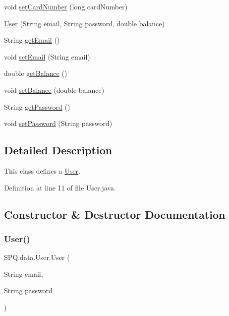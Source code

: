 \begin{DoxyCompactItemize}
\item 
void \mbox{\hyperlink{class_s_p_q_1_1data_1_1_user_a6d98a72cb61e95f5417e10e0ba80afab}{set\+Card\+Number}} (long card\+Number)
\item 
\mbox{\hyperlink{class_s_p_q_1_1data_1_1_user_aa21a25c33b963c3af6fb07331f4cd400}{User}} (String email, String password, double balance)
\item 
String \mbox{\hyperlink{class_s_p_q_1_1data_1_1_user_a4f3ae0062ee7529314a5b791707ff4b4}{get\+Email}} ()
\item 
void \mbox{\hyperlink{class_s_p_q_1_1data_1_1_user_ab7132f971882fb88afc6999cf5473ef4}{set\+Email}} (String email)
\item 
double \mbox{\hyperlink{class_s_p_q_1_1data_1_1_user_a03cc880edbf4758b44318af1587824e5}{get\+Balance}} ()
\item 
void \mbox{\hyperlink{class_s_p_q_1_1data_1_1_user_ab9b205d96fa6c53cc3956c2ddcc9c4a7}{set\+Balance}} (double balance)
\item 
String \mbox{\hyperlink{class_s_p_q_1_1data_1_1_user_a688c1eadd21594d52967d87289e23ce2}{get\+Password}} ()
\item 
void \mbox{\hyperlink{class_s_p_q_1_1data_1_1_user_aa5bcf362d3c9c4746f406239bcb041f5}{set\+Password}} (String password)
\end{DoxyCompactItemize}


\subsection{Detailed Description}
This class defines a \mbox{\hyperlink{class_s_p_q_1_1data_1_1_user}{User}}. 

Definition at line 11 of file User.\+java.



\subsection{Constructor \& Destructor Documentation}
\mbox{\label{class_s_p_q_1_1data_1_1_user_acc8d4cd3f95c3da8a14117c6057a3e8b}} 
\subsubsection{\texorpdfstring{User()}{User()}\hspace{0.1cm}{\footnotesize\ttfamily [1/5]}}
{\footnotesize\ttfamily S\+P\+Q.\+data.\+User.\+User (\begin{DoxyParamCaption}\item[{String}]{email,  }\item[{String}]{password }\end{DoxyParamCaption})}



